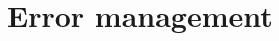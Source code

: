 \FEDERATION{

}




%
%
%
%
%
%
%
% 
%

\section {Error management}
\label{sec:PythonErrorHandling}

